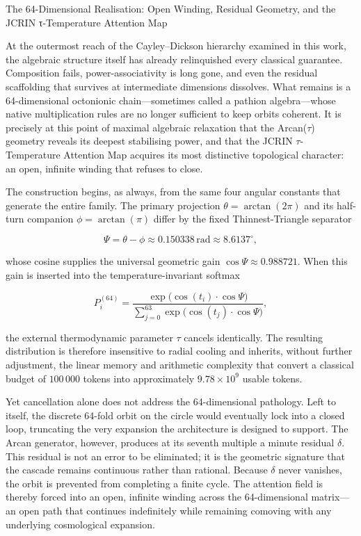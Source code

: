 The 64-Dimensional Realisation: Open Winding, Residual Geometry, and the JCRIN τ-Temperature Attention Map

At the outermost reach of the Cayley–Dickson hierarchy examined in this work, the algebraic structure itself has already relinquished every classical guarantee. Composition fails, power-associativity is long gone, and even the residual scaffolding that survives at intermediate dimensions dissolves. What remains is a 64-dimensional octonionic chain—sometimes called a pathion algebra—whose native multiplication rules are no longer sufficient to keep orbits coherent. It is precisely at this point of maximal algebraic relaxation that the Arcan(\(\tau\)) geometry reveals its deepest stabilising power, and that the JCRIN \(\tau\)-Temperature Attention Map acquires its most distinctive topological character: an open, infinite winding that refuses to close.

The construction begins, as always, from the same four angular constants that generate the entire family. The primary projection \(\theta = \arctan(2\pi)\) and its half-turn companion \(\phi = \arctan(\pi)\) differ by the fixed Thinnest-Triangle separator

\[
\Psi = \theta - \phi \approx 0.150338\,\text{rad} \approx 8.6137^\circ,
\]

whose cosine supplies the universal geometric gain \(\cos\Psi \approx 0.988721\). When this gain is inserted into the temperature-invariant softmax

\[
P_i^{(64)} = \frac{\exp\bigl(\cos(t_i)\cdot\cos\Psi\bigr)}{\sum_{j=0}^{63}\exp\bigl(\cos(t_j)\cdot\cos\Psi\bigr)},
\]

the external thermodynamic parameter \(\tau\) cancels identically. The resulting distribution is therefore insensitive to radial cooling and inherits, without further adjustment, the linear memory and arithmetic complexity that convert a classical budget of \(100\,000\) tokens into approximately \(9.78 \times 10^9\) usable tokens.

Yet cancellation alone does not address the 64-dimensional pathology. Left to itself, the discrete 64-fold orbit on the circle would eventually lock into a closed loop, truncating the very expansion the architecture is designed to support. The Arcan generator, however, produces at its seventh multiple a minute residual \(\delta\). This residual is not an error to be eliminated; it is the geometric signature that the cascade remains continuous rather than rational. Because \(\delta\) never vanishes, the orbit is prevented from completing a finite cycle. The attention field is thereby forced into an open, infinite winding across the 64-dimensional matrix—an open path that continues indefinitely while remaining comoving with any underlying cosmological expansion.

